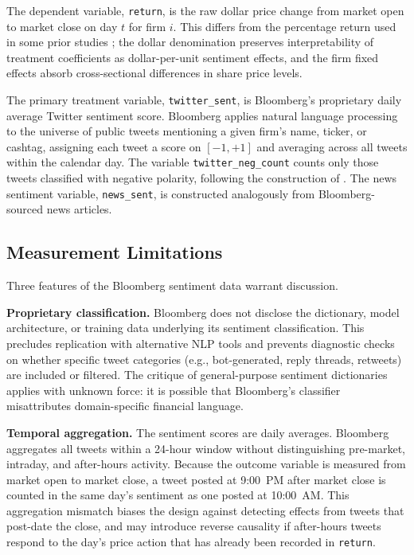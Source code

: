 The dependent variable, \texttt{return}, is the raw dollar price change from market open to
market close on day $t$ for firm $i$. This differs from the percentage return used in some prior
studies \citep{gu2020}; the dollar denomination preserves interpretability of treatment
coefficients as dollar-per-unit sentiment effects, and the firm fixed effects absorb
cross-sectional differences in share price levels.

The primary treatment variable, \texttt{twitter\_sent}, is Bloomberg's proprietary daily average
Twitter sentiment score. Bloomberg applies natural language processing to the universe of public
tweets mentioning a given firm's name, ticker, or cashtag, assigning each tweet a score on $[-1,
+1]$ and averaging across all tweets within the calendar day. The variable
\texttt{twitter\_neg\_count} counts only those tweets classified with negative polarity, following
the construction of \citet{teti2019}. The news sentiment variable, \texttt{news\_sent}, is
constructed analogously from Bloomberg-sourced news articles.

\subsection{Measurement Limitations}
\label{sec:data_limitations}

Three features of the Bloomberg sentiment data warrant discussion.

\textbf{Proprietary classification.} Bloomberg does not disclose the dictionary, model
architecture, or training data underlying its sentiment classification. This precludes replication
with alternative NLP tools and prevents diagnostic checks on whether specific tweet categories
(e.g., bot-generated, reply threads, retweets) are included or filtered. The
\citet{loughran2011} critique of general-purpose sentiment dictionaries applies with unknown
force: it is possible that Bloomberg's classifier misattributes domain-specific financial language.

\textbf{Temporal aggregation.} The sentiment scores are daily averages. Bloomberg aggregates all
tweets within a 24-hour window without distinguishing pre-market, intraday, and after-hours
activity. Because the outcome variable is measured from market open to market close, a tweet
posted at 9:00~PM after market close is counted in the same day's sentiment as one posted at
10:00~AM. This aggregation mismatch biases the design against detecting effects from tweets that
post-date the close, and may introduce reverse causality if after-hours tweets respond to the
day's price action that has already been recorded in \texttt{return}.

